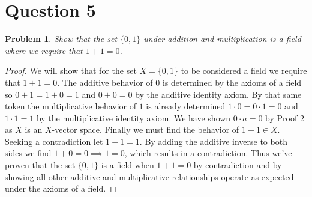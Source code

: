 \documentclass[12pt, letterpaper]{article}
\theoremstyle{plain}
\newtheorem{prob}[theorem]{Problem}
\theoremstyle{definition}
\theoremstyle{remark}
\begin{document}
\section{Question 5} %

\begin{prob}
Show that the set $\{0,1\}$ under addition and multiplication is a field where we require that $1+1=0$.
\end{prob}

\begin{proof}
We will show that for the set $X=\{0,1\}$ to be considered a field we require that $1+1=0$. The additive behavior of $0$ is determined by the axioms of a field so $0+1=1+0=1$ and $0+0=0$ by the additive identity axiom. By that same token the multiplicative behavior of $1$ is already determined $1\cdot 0=0\cdot 1=0$ and $1\cdot 1=1$ by the multiplicative identity axiom. We have shown $0\cdot a=0$ by Proof 2 as $X$ is an $X$-vector space. Finally we must find the behavior of $1+1\in X$. Seeking a contradiction let $1+1=1$. By adding the additive inverse to both sides we find $1+0=0\implies 1=0$, which results in a contradiction. Thus we've proven that the set $\{0,1\}$ is a field when $1+1=0$ by contradiction and by showing all other additive and multiplicative relationships operate as expected under the axioms of a field.
\end{proof}
\end{document}
